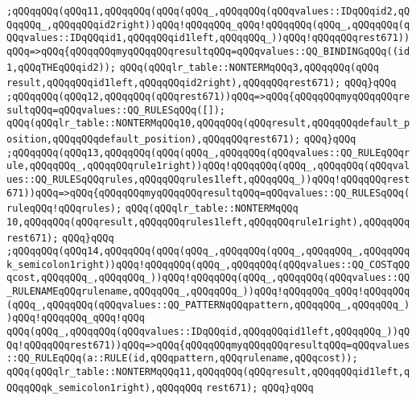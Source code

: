 \verb|;qQQqqQQq(qQQq11,qQQqqQQq(qQQq(qQQq_,qQQqqQQq(qQQqvalues::IDqQQqid2,qQQqqQQq_,qQQqqQQqid2right))qQQq!qQQqqQQq_qQQq!qQQqqQQq(qQQq_,qQQqqQQq(qQQqvalues::IDqQQqid1,qQQqqQQqid1left,qQQqqQQq_))qQQq!qQQqqQQqrest671))qQQq=>qQQq{qQQqqQQqmyqQQqqQQqresultqQQq=qQQqvalues::QQ_BINDINGqQQq((id1,qQQqTHEqQQqid2));|\newline
\verb|qQQq(qQQqlr_table::NONTERMqQQq3,qQQqqQQq(qQQq|\newline
\verb|result,qQQqqQQqid1left,qQQqqQQqid2right),qQQqqQQqrest671);|\newline
\verb|qQQq}qQQq|\newline
\verb|;qQQqqQQq(qQQq12,qQQqqQQq(qQQqrest671))qQQq=>qQQq{qQQqqQQqmyqQQqqQQqresultqQQq=qQQqvalues::QQ_RULESqQQq([]);|\newline
\verb|qQQq(qQQqlr_table::NONTERMqQQq10,qQQqqQQq(qQQqresult,qQQqqQQqdefault_position,qQQqqQQqdefault_position),qQQqqQQqrest671);|\newline
\verb|qQQq}qQQq|\newline
\verb|;qQQqqQQq(qQQq13,qQQqqQQq(qQQq(qQQq_,qQQqqQQq(qQQqvalues::QQ_RULEqQQqrule,qQQqqQQq_,qQQqqQQqrule1right))qQQq!qQQqqQQq(qQQq_,qQQqqQQq(qQQqvalues::QQ_RULESqQQqrules,qQQqqQQqrules1left,qQQqqQQq_))qQQq!qQQqqQQqrest671))qQQq=>qQQq{qQQqqQQqmyqQQqqQQqresultqQQq=qQQqvalues::QQ_RULESqQQq(ruleqQQq!qQQqrules);|\newline
\verb|qQQq(qQQqlr_table::NONTERMqQQq|\newline
\verb|10,qQQqqQQq(qQQqresult,qQQqqQQqrules1left,qQQqqQQqrule1right),qQQqqQQqrest671);|\newline
\verb|qQQq}qQQq|\newline
\verb|;qQQqqQQq(qQQq14,qQQqqQQq(qQQq(qQQq_,qQQqqQQq(qQQq_,qQQqqQQq_,qQQqqQQqk_semicolon1right))qQQq!qQQqqQQq(qQQq_,qQQqqQQq(qQQqvalues::QQ_COSTqQQqcost,qQQqqQQq_,qQQqqQQq_))qQQq!qQQqqQQq(qQQq_,qQQqqQQq(qQQqvalues::QQ_RULENAMEqQQqrulename,qQQqqQQq_,qQQqqQQq_))qQQq!qQQqqQQq_qQQq!qQQqqQQq(qQQq_,qQQqqQQq(qQQqvalues::QQ_PATTERNqQQqpattern,qQQqqQQq_,qQQqqQQq_))qQQq!qQQqqQQq_qQQq!qQQq|\newline
\verb|qQQq(qQQq_,qQQqqQQq(qQQqvalues::IDqQQqid,qQQqqQQqid1left,qQQqqQQq_))qQQq!qQQqqQQqrest671))qQQq=>qQQq{qQQqqQQqmyqQQqqQQqresultqQQq=qQQqvalues::QQ_RULEqQQq(a::RULE(id,qQQqpattern,qQQqrulename,qQQqcost));|\newline
\verb|qQQq(qQQqlr_table::NONTERMqQQq11,qQQqqQQq(qQQqresult,qQQqqQQqid1left,qQQqqQQqk_semicolon1right),qQQqqQQq|\newline
\verb|rest671);|\newline
\verb|qQQq}qQQq|\newline
